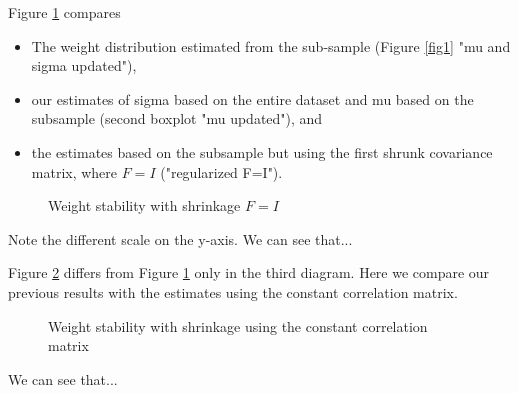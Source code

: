 Figure \ref{fig2} compares  
\begin{itemize}
\item The weight distribution estimated from the sub-sample (Figure \ref{fig1} "mu and sigma updated"),
\item our estimates of sigma based on the entire dataset and mu based on the subsample (second boxplot "mu updated"), and
\item the estimates based on the subsample but using the first shrunk covariance matrix, where $F=I$ ("regularized F=I"). 
\end{itemize}

\begin{figure}[H]
\caption{Weight stability with shrinkage $F=I$}
\label{fig2}
\end{figure}

Note the different scale on the y-axis. We can see that...

 
Figure \ref{fig3} differs from Figure \ref{fig2} only in the third diagram. Here we compare our previous results with the estimates using the constant correlation matrix.
\begin{figure}[H]
\caption{Weight stability with shrinkage using the constant correlation matrix}
\label{fig3}
\end{figure}

We can see that...
